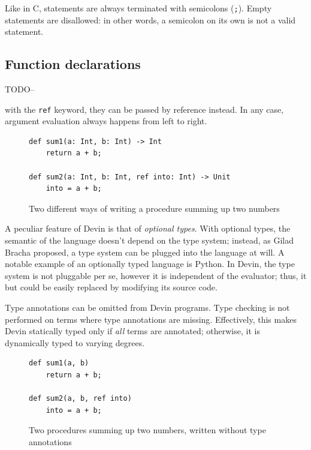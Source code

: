 \documentclass[11pt, american, draft]{PhdThesis}
\begin{document}
  Like in C, statements are always terminated with semicolons (\verb$;$). Empty statements are
  disallowed: in other words, a semicolon on its own is not a valid statement.

  \subsection{Function declarations}

  TODO--

  with the \texttt{ref} keyword, they can be passed by reference instead. In any case, argument
  evaluation always happens from left to right.

  \begin{figure}[H]
    \center

    \begin{verbatim}
def sum1(a: Int, b: Int) -> Int
    return a + b;

def sum2(a: Int, b: Int, ref into: Int) -> Unit
    into = a + b;
    \end{verbatim}

    \caption{Two different ways of writing a procedure summing up two numbers}
  \end{figure}

  A peculiar feature of Devin is that of \emph{optional types}. With optional types, the semantic of
  the language doesn't depend on the type system; instead, as Gilad Bracha proposed\cite{bracha}, a
  type system can be plugged into the language at will. A notable example of an optionally typed
  language is Python. In Devin, the type system is not pluggable per se, however it is independent
  of the evaluator; thus, it but could be easily replaced by modifying its source code.

  Type annotations can be omitted from Devin programs. Type checking is not performed on terms where
  type annotations are missing. Effectively, this makes Devin statically typed only if \emph{all}
  terms are annotated; otherwise, it is dynamically typed to varying degrees.

  \begin{figure}[H]
    \center

    \begin{verbatim}
def sum1(a, b)
    return a + b;

def sum2(a, b, ref into)
    into = a + b;
    \end{verbatim}

    \caption{Two procedures summing up two numbers, written without type annotations}
  \end{figure}
\end{document}
